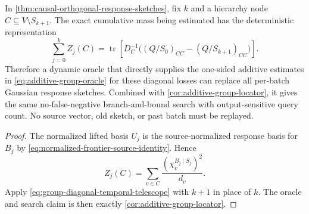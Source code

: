 \begin{corollary}
\label{cor:cumulative-sketch-diagonal-loss}
In \cref{thm:causal-orthogonal-response-sketches}, fix $k$ and a hierarchy
node $C\subseteq V\setminus S_{k+1}$.  The exact cumulative mass being
estimated has the deterministic representation
\begin{equation}
 \sum_{j=0}^k Z_j(C)
 =\operatorname{tr}\!\left[
 D_C^{-1}\bigl((Q/S_0)_{CC}-(Q/S_{k+1})_{CC}\bigr)
 \right].
 \label{eq:cumulative-sketch-diagonal-loss}
\end{equation}
Therefore a dynamic oracle that directly supplies the one-sided additive
estimates in \cref{eq:additive-group-oracle} for these diagonal losses can
replace all per-batch Gaussian response sketches.  Combined with
\cref{cor:additive-group-locator}, it gives the same no-false-negative
branch-and-bound search with output-sensitive query count.  No source vector,
old sketch, or past batch must be replayed.
\end{corollary}

\begin{proof}
The normalized lifted basis $U_j$ is the source-normalized response basis for
$B_j$ by \cref{eq:normalized-frontier-source-identity}.  Hence
\begin{equation*}
 Z_j(C)
 =\sum_{v\in C}\frac{(\chi_v^{B_j\mid S_j})^2}{d_v}.
\end{equation*}
Apply \cref{eq:group-diagonal-temporal-telescope} with $k+1$ in place of
$k$.  The oracle and search claim is then exactly
\cref{cor:additive-group-locator}.
\end{proof}


